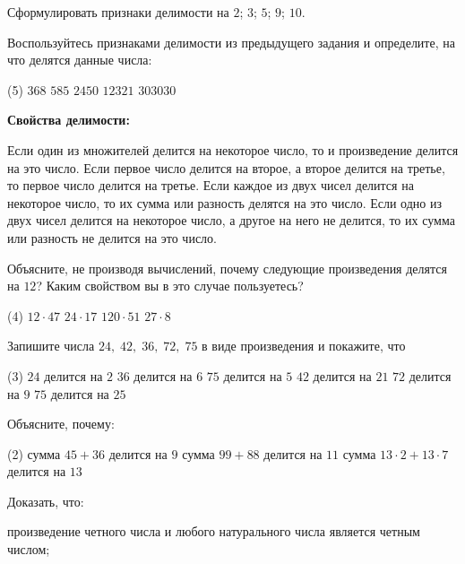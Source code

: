 \begin{class}[number=5]
	\begin{listofex}
	\item Сформулировать признаки делимости на \( 2 \); \( 3 \); \( 5 \); \( 9 \); \( 10 \).
	\item Воспользуйтесь признаками делимости из предыдущего задания и определите, на что делятся данные числа:
	\begin{tasks}(5)
		\task \( 368 \)
		\task \( 585 \)
		\task \( 2450 \)
		\task \( 12321 \)
		\task \( 303030 \)
	\end{tasks}
	\item \textbf{Свойства делимости:}
	\begin{tasks}
		\task Если один из множителей делится на некоторое число, то и произведение делится на это число.
		\task Если первое число делится на второе, а второе делится на третье, то первое число делится на третье.
		\task Если каждое из двух чисел делится на некоторое число, то их сумма или разность делятся на это число.
		\task Если одно из двух чисел делится на некоторое число, а другое на него не делится, то их сумма или разность не делится на это число.
	\end{tasks}
	\item Объясните, не производя вычислений, почему следующие произведения делятся на \( 12 \)? Каким свойством вы в это случае пользуетесь?
	\begin{tasks}(4)
		\task \( 12\cdot47 \)
		\task \( 24\cdot17 \)
		\task \( 120\cdot51 \)
		\task \( 27\cdot8 \)
	\end{tasks}
	\item Запишите числа \( 24,\;42,\;36,\;72,\;75 \) в виде произведения и покажите, что
	\begin{tasks}(3)
		\task \( 24 \) делится на \( 2 \)
		\task \( 36 \) делится на \( 6 \)
		\task \( 75 \) делится на \( 5 \)
		\task \( 42 \) делится на \( 21 \)
		\task \( 72 \) делится на \( 9 \)
		\task \( 75 \) делится на \( 25 \)
	\end{tasks}
	\item Объясните, почему:
	\begin{tasks}(2)
		\task сумма \( 45+36 \) делится на \( 9 \)
		\task сумма \( 99+88 \) делится на \( 11 \)
		\task сумма \( 13\cdot2+13\cdot7\) делится на \( 13 \)
	\end{tasks}
	\item Доказать, что:
	\begin{tasks}
		\task произведение четного числа и любого натурального числа является четным числом;

\end{tasks}
\end{listofex}
\end{class}
